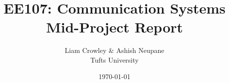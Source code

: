 \documentclass[11pt,onecolumn]{IEEEtran}
\begin{document}
\title{EE107: Communication Systems \\\LARGE Mid-Project Report}
\author{Liam Crowley \& Ashish Neupane\\Tufts University}
\date{\today}
\begin{spacing}{1}
\clearpage\maketitle
\end{spacing}\vspace{-2em}

%
%
\newpage

\end{document}

